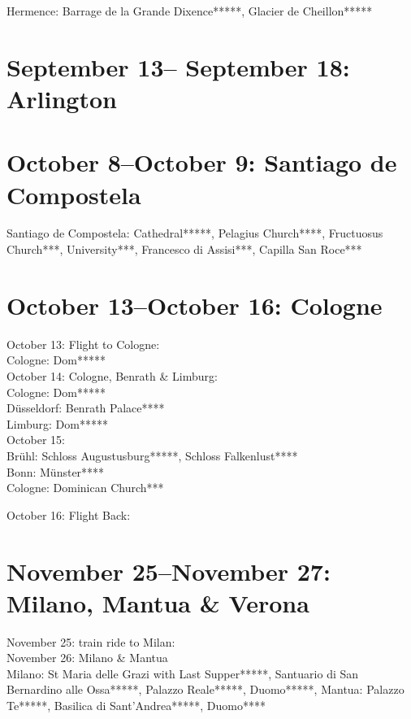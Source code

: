 Hermence: Barrage de la Grande Dixence*****, Glacier de Cheillon*****

\section{September 13-- September 18: Arlington}
\label{Arlington2016}

\section{October 8--October 9: Santiago de Compostela}
\label{Santiago2016}

Santiago de Compostela: Cathedral*****, Pelagius Church****, Fructuosus Church***, University***, Francesco di Assisi***, Capilla San Roce***

\section{October 13--October 16: Cologne}
\label{Cologne2016}

October 13: Flight to Cologne:\\
Cologne: Dom*****\\

October 14: Cologne, Benrath \& Limburg:\\
Cologne: Dom*****\\
D\"usseldorf: Benrath Palace****\\
Limburg: Dom*****\\

October 15:\\
Br\"uhl: Schloss Augustusburg*****, Schloss Falkenlust****\\
Bonn: M\"unster****\\
Cologne: Dominican Church***

October 16: Flight Back:\\


\section{November 25--November 27: Milano, Mantua \& Verona}
\label{Milano2016}

November 25: train ride to Milan:\\

November 26: Milano \& Mantua\\
Milano: St Maria delle Grazi with Last Supper*****, Santuario di San Bernardino alle Ossa*****, Palazzo Reale*****, Duomo*****, Mantua: Palazzo Te*****, Basilica di Sant'Andrea*****, Duomo****\\

